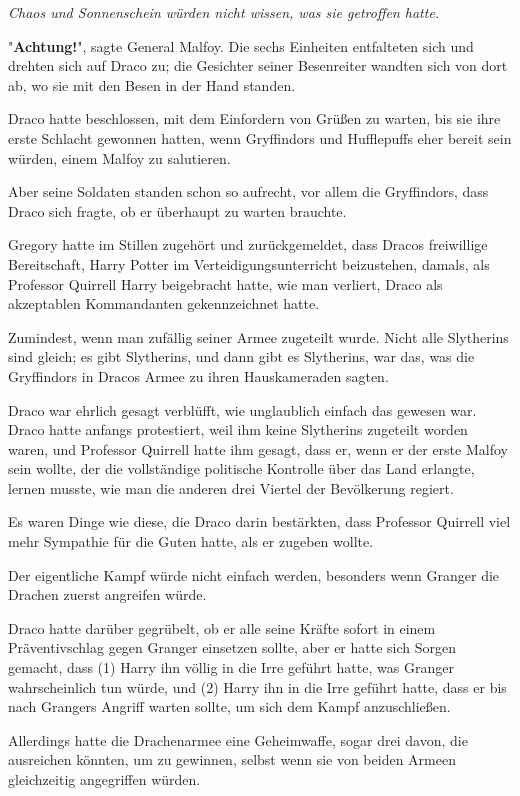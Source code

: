 {\emph{Chaos und Sonnenschein würden nicht wissen, was sie getroffen hatte.}

"\textbf{Achtung!}", sagte General Malfoy. Die sechs Einheiten entfalteten sich und drehten sich auf Draco zu; die Gesichter seiner Besenreiter wandten sich von dort ab, wo sie mit den Besen in der Hand standen.

Draco hatte beschlossen, mit dem Einfordern von Grüßen zu warten, bis sie ihre erste Schlacht gewonnen hatten, wenn Gryffindors und Hufflepuffs eher bereit sein würden, einem Malfoy zu salutieren.

Aber seine Soldaten standen schon so aufrecht, vor allem die Gryffindors, dass Draco sich fragte, ob er überhaupt zu warten brauchte.

Gregory hatte im Stillen zugehört und zurückgemeldet, dass Dracos freiwillige Bereitschaft, Harry Potter im Verteidigungsunterricht beizustehen, damals, als Professor Quirrell Harry beigebracht hatte, wie man verliert, Draco als akzeptablen Kommandanten gekennzeichnet hatte.

Zumindest, wenn man zufällig seiner Armee zugeteilt wurde. Nicht alle Slytherins sind gleich; es gibt Slytherins, und dann gibt es Slytherins, war das, was die Gryffindors in Dracos Armee zu ihren Hauskameraden sagten.

Draco war ehrlich gesagt verblüfft, wie unglaublich einfach das gewesen war. Draco hatte anfangs protestiert, weil ihm keine Slytherins zugeteilt worden waren, und Professor Quirrell hatte ihm gesagt, dass er, wenn er der erste Malfoy sein wollte, der die vollständige politische Kontrolle über das Land erlangte, lernen musste, wie man die anderen drei Viertel der Bevölkerung regiert.

Es waren Dinge wie diese, die Draco darin bestärkten, dass Professor Quirrell viel mehr Sympathie für die Guten hatte, als er zugeben wollte.

Der eigentliche Kampf würde nicht einfach werden, besonders wenn Granger die Drachen zuerst angreifen würde.

Draco hatte darüber gegrübelt, ob er alle seine Kräfte sofort in einem Präventivschlag gegen Granger einsetzen sollte, aber er hatte sich Sorgen gemacht, dass (1) Harry ihn völlig in die Irre geführt hatte, was Granger wahrscheinlich tun würde, und (2) Harry ihn in die Irre geführt hatte, dass er bis nach Grangers Angriff warten sollte, um sich dem Kampf anzuschließen.

Allerdings hatte die Drachenarmee eine Geheimwaffe, sogar drei davon, die ausreichen könnten, um zu gewinnen, selbst wenn sie von beiden Armeen gleichzeitig angegriffen würden.

}
